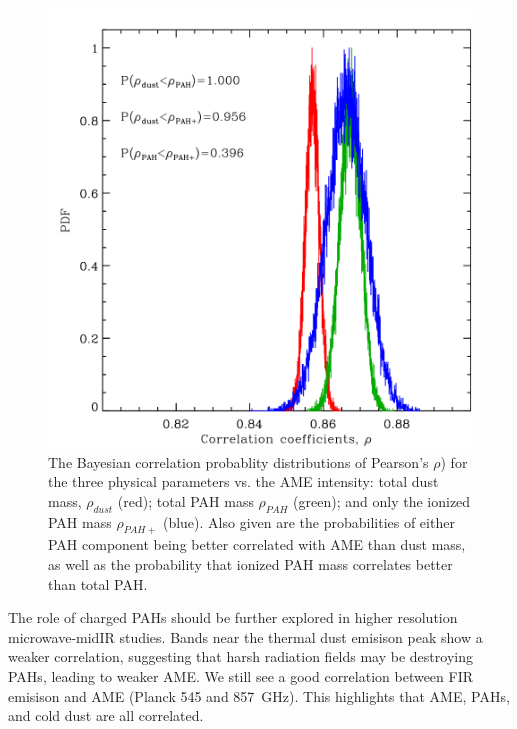 \documentclass[12pt,a4paper]{article}
\begin{document}
  \begin{figure}[h]
    \includegraphics[width=\textwidth/2]{../Plots/ch_lori/fred_LOri_notes_Oct2017_fig2c.pdf}
    \centering
    \caption{\small The Bayesian correlation probablity distributions of Pearson's $\rho{}$) for the three physical parameters vs. the AME intensity: total dust mass, $\rho_{dust}$ (red); total PAH mass $\rho_{PAH}$ (green); and only the ionized PAH mass $\rho_{PAH+}$ (blue). Also given are the probabilities of either PAH component being better correlated with AME than dust mass, as well as the probability that ionized PAH mass correlates better than total PAH.}
    \label{fig:fred_LOri_notes_Oct2017_fig2c}
  \end{figure}
The role of charged PAHs should be further explored in higher resolution microwave-midIR studies. Bands near the thermal dust emisison peak show a weaker correlation, suggesting that harsh radiation fields may be destroying PAHs, leading to weaker AME. We still see a good correlation between FIR emisison and AME (Planck 545 and 857~GHz). This highlights that AME, PAHs, and cold dust are all correlated.
\end{document}
